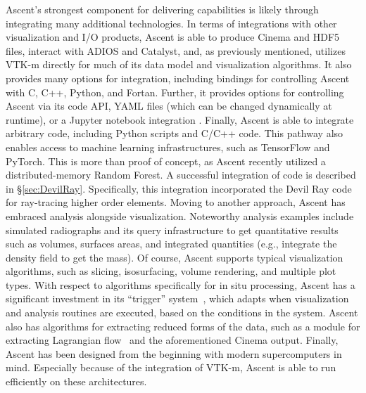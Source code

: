 %
Ascent's strongest component for delivering capabilities is likely
through integrating many additional technologies.
%
In terms of integrations with other visualization and I/O products,
Ascent is able to produce Cinema and HDF5 files, interact with
ADIOS and Catalyst, and, as previously mentioned, utilizes VTK-m
directly for much of its data model and visualization algorithms.
%
It also provides many options for integration, including
bindings
for controlling Ascent with  C, C++, Python, and Fortan.
%
Further, it provides options for controlling Ascent via its code API,
YAML files (which can be changed dynamically at runtime), or
a Jupyter notebook integration \cite{CyrusISAV}.
%
Finally, Ascent is able to integrate arbitrary code, including
Python scripts and C/C++ code.
%
This pathway also enables access to
machine learning infrastructures, such as TensorFlow and PyTorch.
%
This is more than proof of concept,
as Ascent recently utilized a distributed-memory Random Forest.
%
A successful integration of code is described in \S\ref{sec:DevilRay}.
%
Specifically, this integration incorporated the Devil Ray code for ray-tracing
higher order elements.
%
Moving to another approach, Ascent has embraced analysis alongside
visualization.
%
Noteworthy analysis examples include simulated radiographs and its
query infrastructure to get quantitative results such as volumes,
surfaces areas, and integrated quantities (e.g., integrate the density field to get the mass).
%
Of course, Ascent supports typical visualization algorithms, such as
slicing, isosurfacing, volume rendering, and multiple plot types.
%
With respect to algorithms specifically for in situ processing, Ascent
has a significant investment in its ``trigger'' system~\cite{Larsen:ISAV18},
which adapts when visualization and analysis routines are executed,
based on the conditions in the system.
%
Ascent also has algorithms for extracting reduced forms of the data,
such as a module for extracting Lagrangian flow~\cite{Agranovsky:LDAV2014,Sane:EGPGV19} and the
aforementioned Cinema output.
%
Finally, Ascent has been designed from the beginning with modern
supercomputers in mind.
%
Especially because of the integration of VTK-m, Ascent is able to
run efficiently on these architectures.


